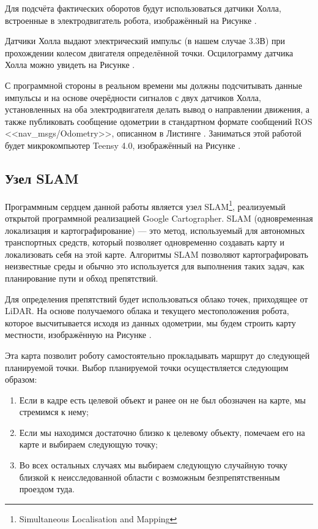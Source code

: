\documentclass[12pt,a4paper]{scrartcl}
\begin{document}
					Для подсчёта фактических оборотов будут использоваться датчики Холла, встроенные в электродвигатель робота, изображённый на Рисунке .
					
					Датчики Холла выдают электрический импульс (в нашем случае 3.3В) при прохождении колесом двигателя определённой точки. Осцилограмму датчика Холла можно увидеть на Рисунке . 
					
					С программной стороны в реальном времени мы должны подсчитывать данные импульсы и на основе очерёдности сигналов с двух датчиков Холла, установленных на оба электродвигателя делать вывод о направлении движения, а также публиковать сообщение одометрии в стандартном формате сообщений ROS <<nav\_msgs/Odometry>>, описанном в Листинге . Заниматься этой работой будет микрокомпьютер Teensy 4.0, изображённый на Рисунке  .
					
			\subsection{Узел SLAM} \label{sec:Movement}
				Программным сердцем данной работы является узел SLAM\footnote{Simultaneous Localisation and Mapping}, реализуемый открытой программной реализацией Google Cartographer. SLAM (одновременная локализация и картографирование) — это метод, используемый для автономных транспортных средств, который позволяет одновременно создавать карту и локализовать себя на этой карте. Алгоритмы SLAM позволяют картографировать неизвестные среды и обычно это используется для выполнения таких задач, как планирование пути и обход препятствий.
				
				Для определения препятствий будет использоваться облако точек, приходящее от LiDAR. На основе получаемого облака и текущего местоположения робота, которое высчитывается исходя из данных одометрии, мы будем строить карту местности, изображённую на Рисунке . 
				
				Эта карта позволит роботу самостоятельно прокладывать маршрут до следующей планируемой точки. Выбор планируемой точки осуществляется следующим образом:
				
				\begin{enumerate}
					\item Если в кадре есть целевой объект и ранее он не был обозначен на карте, мы стремимся к нему;
					\item Если мы находимся достаточно близко к целевому объекту, помечаем его на карте и выбираем следующую точку;
					\item Во всех остальных случаях мы выбираем следующую случайную точку близкой к неисследованной области с возможным безпрепятственным проездом туда. 
				\end{enumerate}
					
\end{document}
